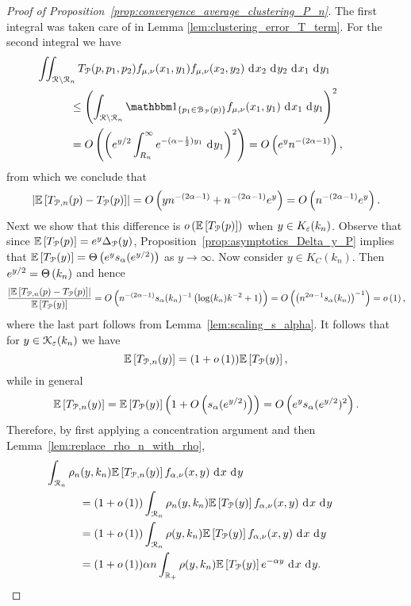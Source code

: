 \begin{proof}[Proof of Proposition~\ref{prop:convergence_average_clustering_P_n}]
The first integral was taken care of in Lemma \ref{lem:clustering_error_T_term}. For the second integral we have
\begin{align*}
	&\hspace{-30pt}\iint_{\Rcal \setminus \Rcal_n} T_{\Pcal}(p,p_1,p_2) f_{\mu, \nu}(x_1,y_1) f_{\mu, \nu}(x_2,y_2)
		\dd x_2 \dd y_2 \dd x_1 \dd y_1\\
	&\le \left(\int_{\Rcal \setminus \Rcal_n} \ind{p_1 \in \BallPo{p}} f_{\mu, \nu}(x_1,y_1) \dd x_1 \dd y_1\right)^2\\
	&= \bigO{\left(e^{y/2} \int_{R_n}^\infty e^{-(\alpha - \frac{1}{2})y_1} \dd y_1\right)^2}
		= \bigO{e^y n^{-(2\alpha - 1)}},
\end{align*}
from which we conclude that
\[
	\left|\mathbb{E}\left[T_{{\mathcal P},n}(p) - T_{{\mathcal P}}(p)\right]\right| = O\left(y n^{-(2\alpha - 1)} + n^{-(2\alpha-1)} e^{y}\right)
	= O\left(n^{-(2\alpha-1)} e^{y}\right).
\]
Next we show that this difference is $o\left(\mathbb{E}\left[T_{{\mathcal P}}(p)\right]\right)$ when $y \in K_\varepsilon(k_n)$.
Observe that since $\mathbb{E}\left[T_{{\mathcal P}}(p)\right] = e^y \Delta_{{\mathcal P}}(y)$, Proposition~\ref{prop:asymptotics_Delta_y_P} implies that $\mathbb{E}\left[T_{{\mathcal P}}(y)\right] = \Theta\left(e^y s_\alpha(e^{y/2})\right)$ as $y \to \infty$.
Now consider $y \in K_C(k_n)$. Then $e^{y/2} = \Theta\left(k_n\right)$ and hence
\[
	\frac{\left|\mathbb{E}\left[T_{{\mathcal P},n}(p) - T_{{\mathcal P}}(p)\right]\right|}{\mathbb{E}\left[T_{{\mathcal P}}(y)\right]} =
	O\left(n^{-(2\alpha - 1)}s_\alpha(k_n)^{-1}\left(\log(k_n)k^{-2} + 1\right)\right) = O\left(\left(n^{2\alpha - 1}s_\alpha(k_n)\right)^{-1}\right) = o\left(1\right), 
\]
where the last part follows from Lemma~\ref{lem:scaling_s_alpha}. It follows that for $y \in {\mathcal K}_\varepsilon(k_n)$ we have
\[
	\mathbb{E}\left[T_{{\mathcal P},n}(y)\right] = (1+o\left(1\right))\mathbb{E}\left[T_{{\mathcal P}}(y)\right],
\]
while in general
\[
	\mathbb{E}\left[T_{{\mathcal P},n}(y)\right] = \mathbb{E}\left[T_{{\mathcal P}}(y)\right]\left(1 + O\left(s_\alpha(e^{y/2})\right)\right) = O\left(e^y s_\alpha(e^{y/2})^2\right).
\]
Therefore, by first applying a concentration argument and then Lemma~\ref{lem:replace_rho_n_with_rho}, 
\begin{align*}
	&\hspace{-30pt}\int_{\Rcal_n} \rho_n(y,k_n) \Exp{T_{\Pcal,n}(y)} f_{\alpha,\nu}(x,y) \dd x \dd y\\
	&= (1+\smallO{1})\int_{\Rcal_n} \rho_n(y,k_n) \Exp{T_\Pcal(y)} f_{\alpha,\nu}(x,y) \dd x \dd y\\
	&= (1 + \smallO{1}) \int_{\Rcal_n} \rho(y,k_n) \Exp{T_\Pcal(y)} f_{\alpha,\nu}(x,y) \dd x \dd y\\
	&= (1 + \smallO{1}) \alpha n \int_{\R_+} \rho(y,k_n) \Exp{T_\Pcal(y)} e^{-\alpha y} \dd x \dd y.
\end{align*}
\end{proof}

